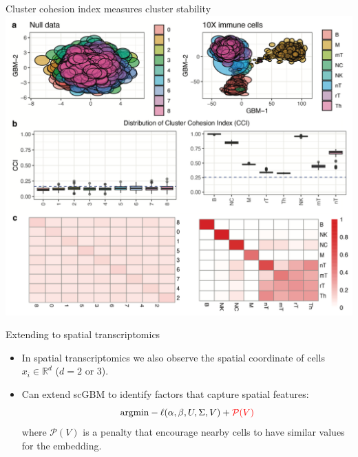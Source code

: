 \documentclass[aspectratio=43]{beamer}
\newcommand{\R}{\mathbb{R}}
\begin{document}
\begin{frame}{Cluster cohesion index measures cluster stability}
\centering
\includegraphics[scale=0.16]{Fig/cci.png}
\end{frame}

\begin{frame}{Extending to spatial transcriptomics}
\begin{itemize}
\item In spatial transcriptomics we also observe the spatial coordinate of cells $x_i \in \R^{d}$ ($d=2$ or $3$). 

\item {Can extend scGBM to identify factors that capture spatial features: 
\begin{equation*}
\text{argmin} -\ell(\alpha, \beta, U, \Sigma, V) + {\color{red} \mathcal{P}(V)}
\end{equation*}
where $\mathcal{P}(V)$ is a penalty that encourage nearby cells to have similar values for the embedding.}
\end{itemize}
\end{frame}
\end{document}
